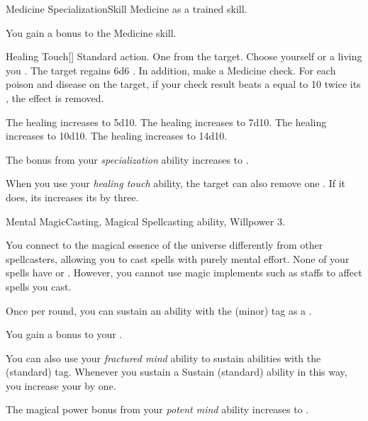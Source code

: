     \begin{feat}{Medicine Specialization}{Skill}
        \featpre Medicine as a trained skill.

         You gain a  bonus to the Medicine skill.

        \begin{activeability}{Healing Touch}[]
            \abilityusagetime Standard action.
            \abilitycost One  from the target.
            \rankline
            Choose yourself or a living  you .
            The target regains 6d6 .
            In addition, make a Medicine check.
            For each poison and disease on the target, if your check result beats a  equal to 10 \add twice its , the effect is removed.

            \rankline
             The healing increases to 5d10.
             The healing increases to 7d10.
             The healing increases to 10d10.
             The healing increases to 14d10.
        \end{activeability}

         The bonus from your \textit{specialization} ability increases to .

         When you use your \textit{healing touch} ability, the target can also remove one .
        If it does, its increases its  by three.
    \end{feat}

    \begin{magicalfeat}{Mental Magic}{Casting, Magical}
        \featpre Spellcasting ability, Willpower 3.

         You connect to the magical essence of the universe differently from other spellcasters, allowing you to cast spells with purely mental effort.
        None of your spells have  or .
        However, you cannot use magic implements such as staffs to affect spells you cast.

         Once per round, you can sustain an ability with the  (minor) tag as a .

         You gain a  bonus to your .

         You can also use your \textit{fractured mind} ability to sustain abilities with the  (standard) tag.
        Whenever you sustain a Sustain (standard) ability in this way, you increase your  by one.

         The magical power bonus from your \textit{potent mind} ability increases to .
    \end{magicalfeat}

